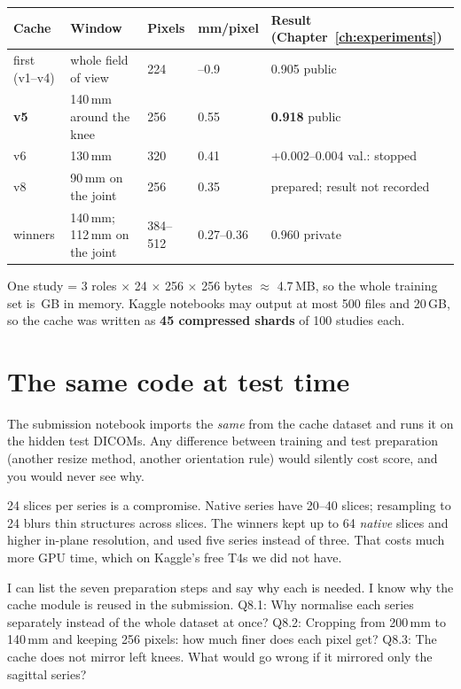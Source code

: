 \begin{center}\footnotesize
\begin{tabular}{lllll}
\toprule
Cache & Window & Pixels & mm/pixel & Result (Chapter~\ref{ch:experiments}) \\
\midrule
first (v1--v4) & whole field of view & 224 & \ca 0.7--0.9 & 0.905 public \\
\textbf{v5} & 140\,mm around the knee & 256 & 0.55 & \textbf{0.918} public \\
v6 & 130\,mm & 320 & 0.41 & +0.002--0.004 val.: stopped \\
v8 & 90\,mm on the joint & 256 & 0.35 & prepared; result not recorded \\
\midrule
\textcolor{them}{winners} & 140\,mm; 112\,mm on the joint & 384--512 & 0.27--0.36 & 0.960 private \\
\bottomrule
\end{tabular}
\end{center}

\begin{innumbers}
One study = 3 roles $\times$ 24 $\times$ 256 $\times$ 256 bytes $\approx$ 4.7\,MB, so the whole training set is
\,GB in memory. Kaggle notebooks may output at most 500 files and 20\,GB, so the cache was written as
\textbf{45 compressed shards} of 100 studies each.
\end{innumbers}

\section{The same code at test time}

\begin{keyidea}
The submission notebook imports the \emph{same}  from the cache dataset and runs it on the
hidden test DICOMs. Any difference between training and test preparation (another resize method, another
orientation rule) would silently cost score, and you would never see why.
\end{keyidea}

\begin{watchout}
24 slices per series is a compromise. Native series have 20--40 slices; resampling to 24 blurs thin structures
across slices. The winners kept up to 64 \emph{native} slices and higher in-plane resolution, and used five series
instead of three. That costs much more GPU time, which on Kaggle's free T4s we did not have.
\end{watchout}

\begin{checkpoint}
\begin{itemize}
\done I can list the seven preparation steps and say why each is needed.
\done I know why the cache module is reused in the submission.
\quiz Q8.1: Why normalise each series separately instead of the whole dataset at once?
\quiz Q8.2: Cropping from 200\,mm to 140\,mm and keeping 256 pixels: how much finer does each pixel get?
\quiz Q8.3: The cache does not mirror left knees. What would go wrong if it mirrored only the sagittal series?
\end{itemize}
\end{checkpoint}
